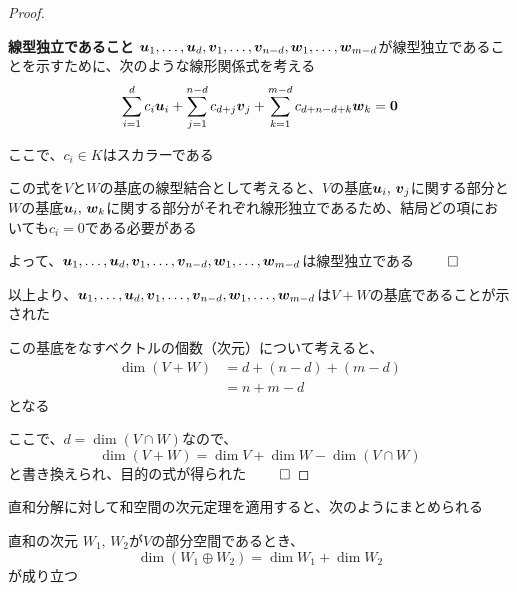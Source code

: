 \documentclass[../../../topic_linear-algebra]{subfiles}
\begin{document}
\begin{proof}
  \begin{subpattern}{\bfseries 線型独立であること}
    $\vb*{u}_1, \dots, \vb*{u}_d, \vb*{v}_1, \dots, \vb*{v}_{n-d}, \vb*{w}_1, \dots, \vb*{w}_{m-d}$が線型独立であることを示すために、次のような線形関係式を考える
    \begin{equation*}
      \sum_{i=1}^d c_i \vb*{u}_i + \sum_{j=1}^{n-d} c_{d+j} \vb*{v}_j + \sum_{k=1}^{m-d} c_{d+n-d+k} \vb*{w}_k = \vb*{0}
    \end{equation*}

    ここで、$c_i \in K$はスカラーである

    \br

    この式を$V$と$W$の基底の線型結合として考えると、$V$の基底$\vb*{u}_i, \, \vb*{v}_j$に関する部分と$W$の基底$\vb*{u}_i, \, \vb*{w}_k$に関する部分がそれぞれ線形独立であるため、結局どの項においても$c_i = 0$である必要がある

    \br

    よって、$\vb*{u}_1, \dots, \vb*{u}_d, \vb*{v}_1, \dots, \vb*{v}_{n-d}, \vb*{w}_1, \dots, \vb*{w}_{m-d}$は線型独立である $\qed$
  \end{subpattern}

  \br

  以上より、$\vb*{u}_1, \dots, \vb*{u}_d, \vb*{v}_1, \dots, \vb*{v}_{n-d}, \vb*{w}_1, \dots, \vb*{w}_{m-d}$は$V + W$の基底であることが示された

  \br

  この基底をなすベクトルの個数（次元）について考えると、
  \begin{align*}
    \dim(V + W) & = d + (n - d) + (m - d) \\
                & = n + m - d
  \end{align*}
  となる

  ここで、$d = \dim(V \cap W)$なので、
  \begin{equation*}
    \dim(V + W) = \dim V + \dim W - \dim(V \cap W)
  \end{equation*}
  と書き換えられ、目的の式が得られた $\qed$
\end{proof}

\sectionline

直和分解に対して和空間の次元定理を適用すると、次のようにまとめられる

\begin{theorem}{直和の次元}
  $W_1,\,W_2$が$V$の部分空間であるとき、
  \begin{equation*}
    \dim(W_1 \oplus W_2) = \dim W_1 + \dim W_2
  \end{equation*}
  が成り立つ
\end{theorem}
\end{document}
